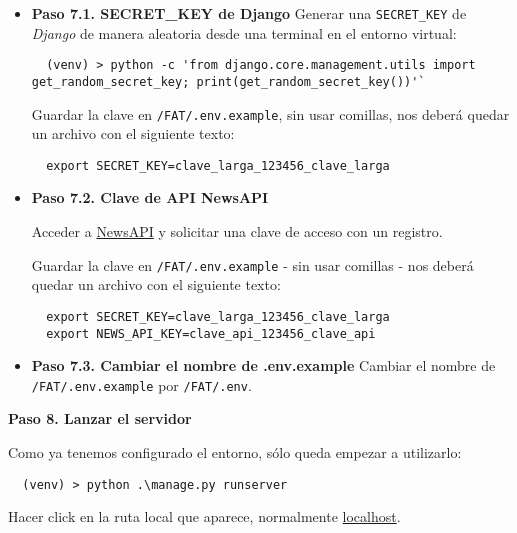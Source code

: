 \begin{itemize}

\item
\textbf{Paso 7.1. SECRET\_KEY de Django}
Generar una \texttt{SECRET\_KEY} de \emph{Django} de manera aleatoria desde una terminal en el entorno virtual:

\begin{verbatim}
  (venv) > python -c 'from django.core.management.utils import get_random_secret_key; print(get_random_secret_key())'`
\end{verbatim}


   Guardar la clave en \texttt{/FAT/.env.example}, sin usar comillas, nos deberá quedar un archivo con el siguiente texto:

\begin{verbatim}
  export SECRET_KEY=clave_larga_123456_clave_larga
\end{verbatim}

\item
\textbf{Paso 7.2. Clave de API NewsAPI}

Acceder a \href{https://newsapi.org/}{NewsAPI} y solicitar una clave de acceso con un registro.

   Guardar la clave en \texttt{/FAT/.env.example} - sin usar comillas - nos deberá quedar un archivo con el siguiente texto:
   
\begin{verbatim}
  export SECRET_KEY=clave_larga_123456_clave_larga
  export NEWS_API_KEY=clave_api_123456_clave_api
\end{verbatim}

\item
\textbf{Paso 7.3. Cambiar el nombre de .env.example}
Cambiar el nombre de \texttt{/FAT/.env.example} por \texttt{/FAT/.env}.

\end{itemize}



\textbf{Paso 8. Lanzar el servidor}

Como ya tenemos configurado el entorno, sólo queda empezar a utilizarlo:

\begin{verbatim}
  (venv) > python .\manage.py runserver
\end{verbatim}

  Hacer click en la ruta local que aparece, normalmente \href{http://127.0.0.1:8000/}{localhost}.



